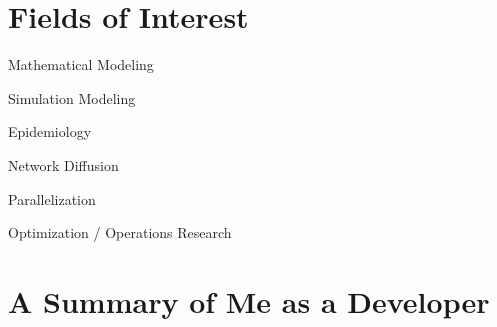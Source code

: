 \documentclass[10pt,letterpaper]{article}
\renewenvironment{itemize}{
  \begin{list}{}{
    \setlength{\leftmargin}{1.5em}
    \setlength{\itemsep}{0.25em}
    \setlength{\parskip}{0pt}
    \setlength{\parsep}{0.25em}
  }
}{
  \end{list}
}
\begin{document}

\section*{Fields of Interest}
\begin{itemize}
\item Mathematical Modeling
\item Simulation Modeling
\item Epidemiology
\item Network Diffusion
\item Parallelization
\item Optimization / Operations Research
\end{itemize}

\newpage

\section*{A Summary of Me as a Developer}
\end{document}
